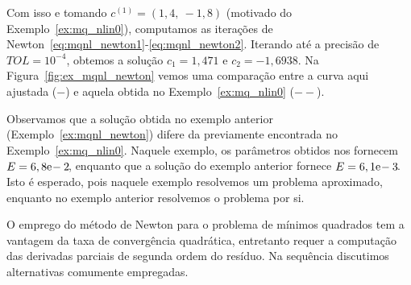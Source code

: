 \begin{ex}
Com isso e tomando $c^{(1)} = (1,4, ~-1,8)$ (motivado do Exemplo~\ref{ex:mq_nlin0}), computamos as iterações de Newton~\eqref{eq:mqnl_newton1}-\eqref{eq:mqnl_newton2}. Iterando até a precisão de $TOL = 10^{-4}$, obtemos a solução $c_1 = 1,471$ e $c_2 = -1,6938$. Na Figura~\ref{fig:ex_mqnl_newton} vemos uma comparação entre a curva aqui ajustada ($-$) e aquela obtida no Exemplo~\ref{ex:mq_nlin0} ($--$).







\end{ex}

Observamos que a solução obtida no exemplo anterior (Exemplo~\ref{ex:mqnl_newton}) difere da previamente encontrada no Exemplo~\ref{ex:mq_nlin0}. Naquele exemplo, os parâmetros obtidos nos fornecem $E = 6,8\mathrm{e}\!-2\!$, enquanto que a solução do exemplo anterior fornece $E = 6,1\mathrm{e}\!-3\!$. Isto é esperado, pois naquele exemplo resolvemos um problema aproximado, enquanto no exemplo anterior resolvemos o problema por si.

O emprego do método de Newton para o problema de mínimos quadrados tem a vantagem da taxa de convergência quadrática, entretanto requer a computação das derivadas parciais de segunda ordem do resíduo. Na sequência discutimos alternativas comumente empregadas.

